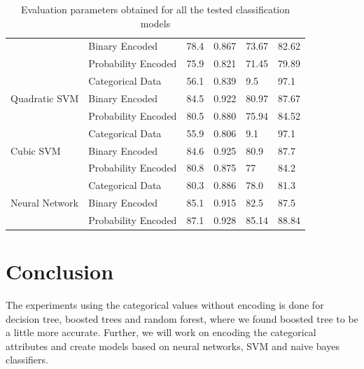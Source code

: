 \documentclass{article} %
\begin{document}
\begin{table}[]
{\begin{tabular}{|l|l|l|l|l|l|}
					& Binary Encoded                                             & 78.4             & 0.867            & 73.67       & 82.62      \\ \cline{2-6} 
					& Probability Encoded                                        & 75.9             & 0.821            & 71.45       & 79.89      \\ \hline
					\multirow{3}{*}{Quadratic SVM}                                   & Categorical Data                                           & 56.1             & 0.839            & 9.5         & 97.1       \\ \cline{2-6} 
					& Binary Encoded                                             & 84.5             & 0.922            & 80.97       & 87.67      \\ \cline{2-6} 
					& Probability Encoded                                        & 80.5             & 0.880            & 75.94       & 84.52      \\ \hline
					\multirow{3}{*}{Cubic SVM}                                       & Categorical Data                                           & 55.9             & 0.806            & 9.1         & 97.1       \\ \cline{2-6} 
					& Binary Encoded                                             & 84.6             & 0.925            & 80.9        & 87.7       \\ \cline{2-6} 
					& Probability Encoded                                        & 80.8             & 0.875            & 77          & 84.2       \\ \hline
					\multirow{3}{*}{Neural Network}                                  & Categorical Data                                           & 80.3             & 0.886            & 78.0        & 81.3       \\ \cline{2-6} 
					& Binary Encoded                                             & 85.1             & 0.915            & 82.5        & 87.5       \\ \cline{2-6} 
					& Probability Encoded                                        & 87.1             & 0.928            & 85.14       & 88.84      \\ \hline
				\end{tabular}
			}
			\caption{Evaluation parameters obtained for all the tested classification models}
			\label{table:Table1}
		\end{table}
	
	
	\section{Conclusion}
	The experiments using the categorical values without encoding is done for decision tree, boosted trees and random forest, where we found boosted tree to be a little more accurate. Further, we will work on encoding the categorical attributes and create models based on neural networks, SVM and naive bayes classifiers.
	
\end{document}
